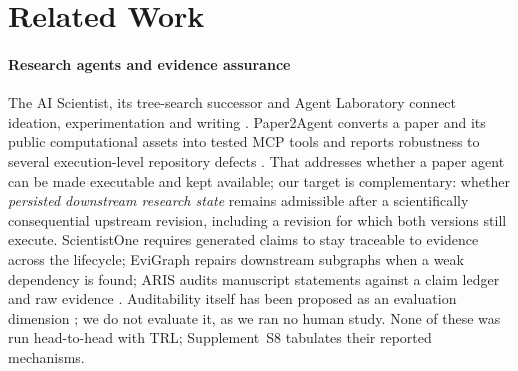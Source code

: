 \documentclass[journal]{IEEEtran}
\newcommand{\suppl}[1]{Supplement~#1}
\begin{document}
\section{Related Work}
\label{sec:related}
\paragraph{Research agents and evidence assurance}
The AI Scientist, its tree-search successor and Agent Laboratory connect ideation, experimentation and writing \cite{lu2026aiscientist,yamada2025aiscientistv2,schmidgall2025agentlab}. Paper2Agent converts a paper and its public computational assets into tested MCP tools and reports robustness to several execution-level repository defects \cite{miao2026paper2agent}. That addresses whether a paper agent can be made executable and kept available; our target is complementary: whether \emph{persisted downstream research state} remains admissible after a scientifically consequential upstream revision, including a revision for which both versions still execute. ScientistOne requires generated claims to stay traceable to evidence across the lifecycle; EviGraph repairs downstream subgraphs when a weak dependency is found; ARIS audits manuscript statements against a claim ledger and raw evidence \cite{meng2026scientistone,ren2026evigraph,yang2026aris}. Auditability itself has been proposed as an evaluation dimension \cite{rasheed2026auditability,martinboyle2026papertrail}; we do not evaluate it, as we ran no human study. None of these was run head-to-head with TRL; \suppl{S8} tabulates their reported mechanisms.
\end{document}
